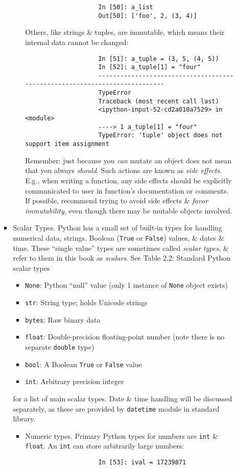 \documentclass{article}
\begin{document}
\begin{itemize}
\begin{itemize}
\begin{itemize}
\begin{itemize}
\begin{verbatim}
					In [50]: a_list
					Out[50]: ['foo', 2, (3, 4)]
				\end{verbatim}
				Others, like strings \& tuples, are immutable, which means their internal data cannot be changed:
				\begin{verbatim}
					In [51]: a_tuple = (3, 5, (4, 5))
					In [52]: a_tuple[1] = "four"
					---------------------------------------------------------------------------
					TypeError
					Traceback (most recent call last)
					<ipython-input-52-cd2a018a7529> in <module>
					----> 1 a_tuple[1] = "four"
					TypeError: 'tuple' object does not support item assignment
				\end{verbatim}
				Remember: just because you {\it can} mutate an object does not mean that you always {\it should}. Such actions are known as {\it side effects}. E.g., when writing a function, any side effects should be explicitly communicated to user in function's documentation or comments. If possible, recommend trying to avoid side effects \& {\it favor immutability}, even though there may be mutable objects involved.
			\end{itemize}
			\item {\sc Scalar Types.} Python has a small set of built-in types for handling numerical data, strings, Boolean ({\tt True} or {\tt False}) values, \& dates \& time. These ``single value'' types are sometimes called {\it scalar types}, \& refer to them in this book as {\it scalars}. See {\sf Table 2.2: Standard Python scalar types}
			\begin{itemize}
				\item {\tt None}: Python ``null'' value (only 1 instance of {\tt None} object exists)
				\item {\tt str}: String type; holds Unicode strings
				\item {\tt bytes}: Raw binary data
				\item {\tt float}: Double-precision floating-point number (note there is no separate {\tt double} type)
				\item {\tt bool}: A Boolean {\tt True} or {\tt False} value
				\item {\tt int}: Arbitrary precision integer
			\end{itemize}
			for a list of main scalar types. Date \& time handling will be discussed separately, as these are provided by {\tt datetime} module in standard library.
			\begin{itemize}
				\item {\sf Numeric types.} Primary Python types for numbers are {\tt int} \& {\tt float}. An {\tt int} can store arbitrarily large numbers:
				\begin{verbatim}
					In [53]: ival = 17239871
					

\end{verbatim}
\end{itemize}
\end{itemize}
\end{itemize}
\end{itemize}
\end{document}
